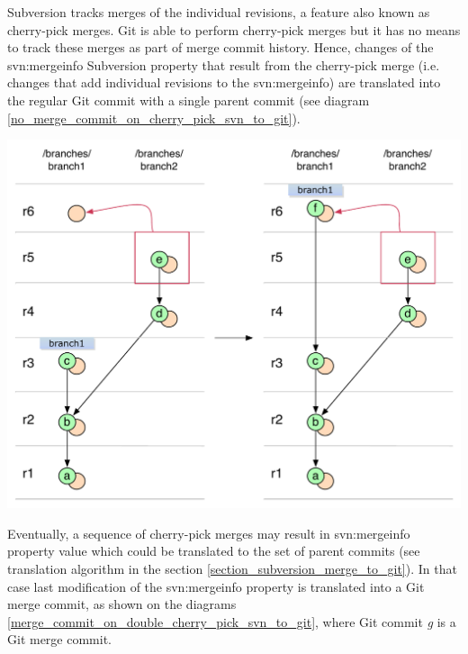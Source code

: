 Subversion tracks merges of the individual revisions, a feature also known as cherry-pick merges. 
Git is able to perform cherry-pick merges but it has no means to track these merges as part of merge commit history. 
Hence, changes of the svn:mergeinfo Subversion property that result from the cherry-pick merge (i.e. changes that add individual revisions to the svn:mergeinfo) are
translated into the regular Git commit with a single parent commit (see diagram \ref{no_merge_commit_on_cherry_pick_svn_to_git}).
\begin{center}
\includegraphics[width=\textwidth]{img/diagrams/no_merge_commit_on_cherry_pick_svn_to_git.pdf}%
\label{no_merge_commit_on_cherry_pick_svn_to_git}%
\end{center}

Eventually, a sequence of cherry-pick merges may result in svn:mergeinfo property value which could 
be translated to the set of parent commits (see translation algorithm in the section \ref{section_subversion_merge_to_git}).
In that case last modification of the svn:mergeinfo property is translated into a Git merge commit, as 
shown on the diagrams \ref{merge_commit_on_double_cherry_pick_svn_to_git},
where Git commit \emph{g} is a Git merge commit.

